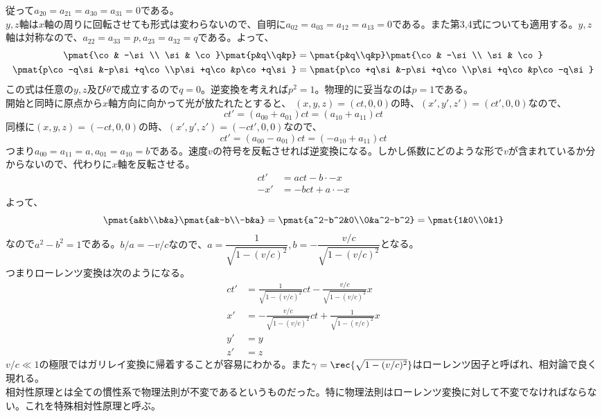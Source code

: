     従って$a_{20}=a_{21}=a_{30}=a_{31}=0$である。\\$y,z$軸は$x$軸の周りに回転させても形式は変わらないので、自明に$a_{02}=a_{03}=a_{12}=a_{13}=0$である。また第3,4式についても適用する。$y,z$軸は対称なので、$a_{22}=a_{33}=p,a_{23}=a_{32}=q$である。よって、
    \begin{align*}
        \pmat{\co & -\si\\ \si & \co}\pmat{p&q\\q&p}
        &= \pmat{p&q\\q&p}\pmat{\co & -\si\\ \si & \co}\\
        \pmat{p\co-q\si&-p\si+q\co\\p\si+q\co&p\co+q\si}
        &= \pmat{p\co+q\si&-p\si+q\co\\p\si+q\co&p\co-q\si}
    \end{align*}
    この式は任意の$y,z及び\theta$で成立するので$q=0$。逆変換を考えれば$p^2=1$。物理的に妥当なのは$p=1$である。\\開始と同時に原点から$x$軸方向に向かって光が放たれたとすると、
    $(x,y,z)=(ct,0,0)の時、(x',y',z')=(ct',0,0)$なので、
        \[ct' = (a_{00}+a_{01})ct = (a_{10}+a_{11})ct\]
    同様に$(x,y,z)=(-ct,0,0)の時、(x',y',z')=(-ct',0,0)$なので、
        \[ct' = (a_{00}-a_{01})ct = (-a_{10}+a_{11})ct\]
    つまり$a_{00}=a_{11}=a,a_{01}=a_{10}=b$である。速度$v$の符号を反転させれば逆変換になる。しかし係数にどのような形で$v$が含まれているか分からないので、代わりに$x$軸を反転させる。
    \begin{align*}
        ct' &= act-b\cdot -x\\
        -x' &= -bct + a\cdot -x
    \end{align*}
    よって、
    \[
        \pmat{a&b\\b&a}\pmat{a&-b\\-b&a}
        =\pmat{a^2-b^2&0\\0&a^2-b^2}=\pmat{1&0\\0&1}
    \]
    なので$a^2-b^2=1$である。$b/a=-v/cなので、a=\dfrac{1}{\sqrt{1-(v/c)^2}}
    ,b=-\dfrac{v/c}{\sqrt{1-(v/c)^2}}$となる。\\
    つまりローレンツ変換は次のようになる。
    \begin{align*}
        ct' &= \frac{1}{\sqrt{1-(v/c)^2}}ct-\frac{v/c}{\sqrt{1-(v/c)^2}}x\\
        x' &= -\frac{v/c}{\sqrt{1-(v/c)^2}}ct+\frac{1}{\sqrt{1-(v/c)^2}}x\\
        y' &= y\\
        z' &= z
    \end{align*}
    $v/c\ll 1$の極限ではガリレイ変換に帰着することが容易にわかる。また$\gamma=\rec{\sqrt{1-(v/c)^2}}$はローレンツ因子と呼ばれ、相対論で良く現れる。\\
    相対性原理とは全ての慣性系で物理法則が不変であるというものだった。特に物理法則はローレンツ変換に対して不変でなければならない。これを特殊相対性原理と呼ぶ。

